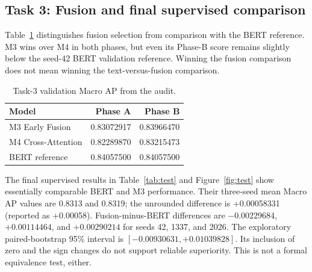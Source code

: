 \documentclass[conference]{IEEEtran}
\begin{document}
\subsection{Task 3: Fusion and final supervised comparison}
Table~\ref{tab:fusionval} distinguishes fusion selection from comparison with the BERT reference. M3 wins over M4 in both phases, but even its Phase-B score remains slightly below the seed-42 BERT validation reference. Winning the fusion comparison does not mean winning the text-versus-fusion comparison.
\begin{table}[t]\centering\small
\caption{Task-3 validation Macro AP from the audit.}\label{tab:fusionval}
\begin{tabular}{@{}lrr@{}}\toprule
Model & Phase A & Phase B\\\midrule
M3 Early Fusion & 0.83072917 & 0.83966470\\
M4 Cross-Attention & 0.82289870 & 0.83215473\\
BERT reference & 0.84057500 & 0.84057500\\\bottomrule
\end{tabular}
\end{table}

The final supervised results in Table~\ref{tab:test} and Figure~\ref{fig:test} show essentially comparable BERT and M3 performance. Their three-seed mean Macro AP values are 0.8313 and 0.8319; the unrounded difference is +0.00058331 (reported as +0.00058). Fusion-minus-BERT differences are $-0.00229684$, $+0.00114464$, and $+0.00290214$ for seeds 42, 1337, and 2026. The exploratory paired-bootstrap 95\% interval is $[-0.00930631,+0.01039828]$. Its inclusion of zero and the sign changes do not support reliable superiority. This is not a formal equivalence test, either.
\end{document}
